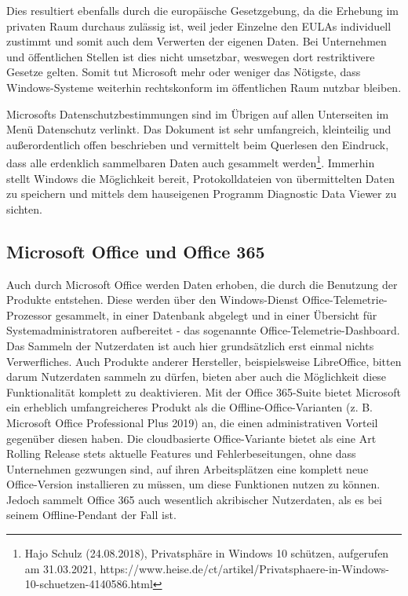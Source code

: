 Dies resultiert ebenfalls durch die europäische Gesetzgebung, da die Erhebung im privaten Raum durchaus zulässig ist, weil jeder Einzelne den EULAs individuell zustimmt und somit auch dem Verwerten der eigenen Daten. Bei Unternehmen und öffentlichen Stellen ist dies nicht umsetzbar, weswegen dort restriktivere Gesetze gelten. Somit tut Microsoft mehr oder weniger das Nötigste, dass Windows-Systeme weiterhin rechtskonform im öffentlichen Raum nutzbar bleiben.

Microsofts Datenschutzbestimmungen sind im Übrigen auf allen Unterseiten im Menü \glqq Datenschutz\grqq{} verlinkt. Das Dokument ist sehr umfangreich, kleinteilig und außerordentlich offen beschrieben und vermittelt beim Querlesen den Eindruck, dass alle erdenklich sammelbaren Daten auch gesammelt werden\footnote{Hajo Schulz (24.08.2018), Privatsphäre in Windows 10 schützen, aufgerufen am 31.03.2021, https://www.heise.de/ct/artikel/Privatsphaere-in-Windows-10-schuetzen-4140586.html}. Immerhin stellt Windows die Möglichkeit bereit, Protokolldateien von übermittelten Daten zu speichern und mittels dem hauseigenen Programm \glqq Diagnostic Data Viewer\grqq{} zu sichten.

\subsection{Microsoft Office und Office 365}
Auch durch Microsoft Office werden Daten erhoben, die durch die Benutzung der Produkte entstehen. Diese werden über den Windows-Dienst \glqq Office-Telemetrie-Prozessor\grqq{} gesammelt, in einer Datenbank abgelegt und in einer Übersicht für Systemadministratoren aufbereitet - das sogenannte \glqq Office-Telemetrie-Dashboard\grqq{}.\\
Das Sammeln der Nutzerdaten ist auch hier grundsätzlich erst einmal nichts Verwerfliches. Auch Produkte anderer Hersteller, beispielsweise LibreOffice, bitten darum Nutzerdaten sammeln zu dürfen, bieten aber auch die Möglichkeit diese Funktionalität komplett zu deaktivieren. Mit der \glqq Office 365\grqq{}-Suite bietet Microsoft ein erheblich umfangreicheres Produkt als die Offline-Office-Varianten (z. B. Microsoft Office Professional Plus 2019) an, die einen administrativen Vorteil gegenüber diesen haben. Die cloudbasierte Office-Variante bietet als eine Art \glqq Rolling Release\grqq{} stets aktuelle Features und Fehlerbeseitungen, ohne dass Unternehmen gezwungen sind, auf ihren Arbeitsplätzen eine komplett neue Office-Version installieren zu müssen, um diese Funktionen nutzen zu können. Jedoch sammelt Office 365 auch wesentlich akribischer Nutzerdaten, als es bei seinem Offline-Pendant der Fall ist.

